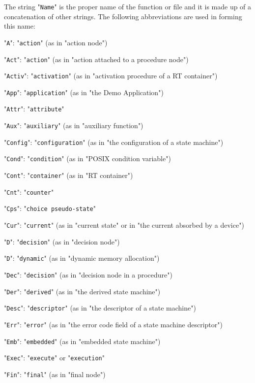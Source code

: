 \documentclass[manual]{../fwprofile}
\begin{document}
The string "\texttt{Name}" is the proper name of the function or file and it is made up of a concatenation of other strings. The following abbreviations are used in forming this name:

\begin{fw_itemize}
\item "\texttt{A}": "\texttt{action}" (as in "action node")
\item "\texttt{Act}": "\texttt{action}" (as in "action attached to a procedure node")
\item "\texttt{Activ}": "\texttt{activation}" (as in "activation procedure of a RT container")
\item "\texttt{App}": "\texttt{application}" (as in "the Demo Application")
\item "\texttt{Attr}": "\texttt{attribute}"
\item "\texttt{Aux}": "\texttt{auxiliary}" (as in "auxiliary function")
\item "\texttt{Config}": "\texttt{configuration}" (as in "the configuration of a state machine")
\item "\texttt{Cond}": "\texttt{condition}" (as in "POSIX condition variable")
\item "\texttt{Cont}": "\texttt{container}" (as in "RT container")
\item "\texttt{Cnt}": "\texttt{counter}"
\item "\texttt{Cps}": "\texttt{choice pseudo-state}"
\item "\texttt{Cur}": "\texttt{current}" (as in "current state" or in "the current absorbed by a device")
\item "\texttt{D}": "\texttt{decision}" (as in "decision node")
\item "\texttt{D}": "\texttt{dynamic}" (as in "dynamic memory allocation")
\item "\texttt{Dec}": "\texttt{decision}" (as in "decision node in a procedure")
\item "\texttt{Der}": "\texttt{derived}" (as in "the derived state machine")
\item "\texttt{Desc}": "\texttt{descriptor}" (as in "the descriptor of a state machine")
\item "\texttt{Err}": "\texttt{error}" (as in "the error code field of a state machine descriptor")
\item "\texttt{Emb}": "\texttt{embedded}" (as in "embedded state machine")
\item "\texttt{Exec}": "\texttt{execute}" or "\texttt{execution}"
\item "\texttt{Fin}": "\texttt{final}" (as in "final node")

\end{fw_itemize}
\end{document}
